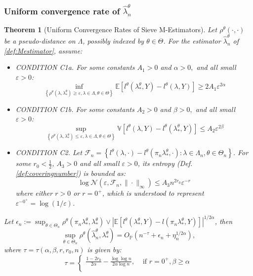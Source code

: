 \documentclass[12pt]{article}
\theoremstyle{myplain}
\newtheorem{theorem}{Theorem}[section]
\theoremstyle{definition}
\theoremstyle{definition}
\theoremstyle{remark}
\numberwithin{equation}{section}
\begin{document}
\subsubsection{Uniform convergence rate of $\widehat{\lambda}_{n}^\theta$} \label{subsubsec:mrates}
\begin{theorem}[Uniform Convergence Rates of Sieve M-Estimators]\label{thm:Mestimators} Let $\rho^\theta(\cdot,\cdot)$ be a pseudo-distance on $\Lambda$, possibly indexed by $\theta\in\Theta$. For the estimator $\widehat{\lambda}_{n}^\theta$ of \ref{def:Mestimator}, assume:
\begin{itemize}
\item[] CONDITION C1a. For some constants $A_{1}>0$ and $\alpha>0,$ and all small $\varepsilon>0$: $$\inf _{\left\{\rho^\theta\left(\lambda, \lambda_*^\theta\right) \geq \varepsilon, \lambda \in \Lambda,\theta\in\Theta\right\}} \mathbb{E}\left[l^\theta\left(\lambda_*^\theta, Y\right)-l^\theta(\lambda, Y)\right] \geq 2 A_{1} \varepsilon^{2 \alpha} $$
\item[] CONDITION C1b. For some constants $A_{2}>0$ and $\beta>0,$ and all small $\varepsilon>0$: $$\sup _{\left\{\rho^\theta\left(\lambda, \lambda_*^\theta\right) \leq \varepsilon,\lambda \in \Lambda,\theta\in\Theta\right\}} \mathbb{V}\left[l^\theta(\lambda, Y)-l^\theta\left(\lambda_*^\theta, Y\right)\right] \leq A_{2} \varepsilon^{2 \beta} $$
\item[] CONDITION C2. Let $\mathcal{F}_{n}=\left\{l^\theta(\lambda, \cdot)-l^\theta\left(\pi_{n} \lambda_*^\theta, \cdot\right): \lambda \in \Lambda_{n},\theta\in\Theta_n\right\}$.  For some $r_0<\frac{1}{2}$, $A_{3}>0$ and all small $\varepsilon>0$, its entropy (Def. \ref{def:coveringnumber}) is bounded as:
\[\log\mathcal{N}\left(\varepsilon, \mathcal{F}_{n}, \|\cdot\|_\infty\right) \leq A_{3} n^{2 r_0} \varepsilon^{-r}\] where either $r>0$ or $r=0^+$, which is understood to represent $\varepsilon^{-0^+}=\log(1/\varepsilon)$.
\end{itemize}
Let $\epsilon_n := \sup_{\theta\in\Theta_n} \rho^\theta\left(\pi_{n} \lambda_*^\theta, \lambda_*^\theta\right) \vee \left| \mathbb{E}\left[l^\theta(\lambda_*^\theta, Y)-l(\pi_{n} \lambda_*^\theta, Y)\right]\right|^{1/2\alpha}$, then
$$\sup_{\theta\in\Theta_n} \rho^\theta\left(\widehat{\lambda}_{n}^\theta, \lambda_*^\theta\right)=O_{\mathbb{P}}\left(n^{-\tau} + \epsilon_n + \eta_{n}^{1/2\alpha}\right),$$
where $\tau=\tau(\alpha, \beta, r, r_0, n)$ is given by:
$$
\tau=\left\{\begin{array}{ll}
\frac{1-2 r_0}{2 \alpha}-\frac{\log \log n}{2 \alpha \log n}, & \text { if } r=0^{+}, \beta \geq \alpha \\

\end{array}$$
\end{theorem}
\end{document}
